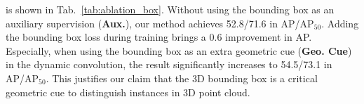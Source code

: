 \documentclass[10pt,twocolumn,letterpaper]{article}
\def\Approach{ISBNet}
\begin{document}

 is shown in Tab.~\ref{tab:ablation_box}. Without using the bounding box as an auxiliary supervision (\textbf{Aux.}), our method achieves 52.8/71.6 in AP/AP$_{50}$. Adding the bounding box loss during training brings a 0.6 improvement in AP. Especially, when using the bounding box as an extra geometric cue (\textbf{Geo. Cue}) in the dynamic convolution, the result significantly increases to 54.5/73.1 in AP/AP$_{50}$. This justifies our claim that the 3D bounding box is a critical geometric cue to distinguish instances in 3D point cloud.
\end{document}
